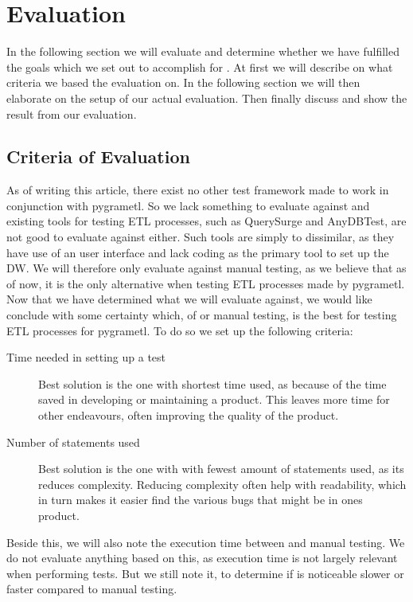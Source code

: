 \section{Evaluation}\label{sect:eval}
In the following section we will evaluate and determine whether we have fulfilled the goals which we set out to accomplish for \FW{}. At first we will describe on what criteria we based the evaluation on. In the following section we will then elaborate on the setup of our actual evaluation. Then finally discuss and show the result from our evaluation.

\subsection{Criteria of Evaluation}\label{subsect:CoE}
As of writing this article, there exist no other test framework made to work in conjunction with pygrametl. So we lack something to evaluate against and existing tools for testing ETL processes, such as QuerySurge and AnyDBTest, are not good to evaluate against either. Such tools are simply to dissimilar, as they have use of an user interface and lack coding as the primary tool to set up the DW. We will therefore only evaluate \FW{} against manual testing, as we believe that as of now, it is the only alternative when testing ETL processes made by pygrametl. Now that we have determined what we will evaluate \FW{} against, we would like conclude with some certainty which, of \FW{} or manual testing, is the best for testing ETL processes for pygrametl. To do so we set up the following criteria:

\begin{description}
\item[Time needed in setting up a test] Best solution is the one with shortest time used, as because of the time saved in developing or maintaining a product. This leaves more time for other endeavours, often improving the quality of the product.
\item[Number of statements used] Best solution is the one with with fewest amount of statements used, as its reduces complexity. Reducing complexity often help with readability, which in turn makes it easier find the various bugs that might be in ones product.
\end{description}
Beside this, we will also note the execution time between \FW{} and manual testing. We do not evaluate anything based on this, as execution time is not largely relevant when performing tests. But we still note it, to determine if \FW{} is noticeable slower or faster compared to manual testing.


